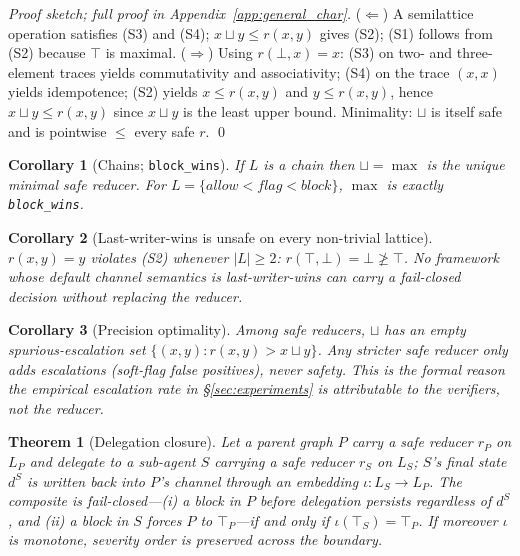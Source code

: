 \documentclass{article}
\newtheorem{theorem}{Theorem}
\newtheorem{corollary}{Corollary}
\begin{document}
\begin{proof}[Proof sketch; full proof in Appendix~\ref{app:general_char}]
($\Leftarrow$) A semilattice operation satisfies (S3) and (S4); $x\sqcup y\le r(x,y)$
gives (S2); (S1) follows from (S2) because $\top$ is maximal.
($\Rightarrow$) Using $r(\bot,x)=x$: (S3) on two- and three-element traces yields
commutativity and associativity; (S4) on the trace $(x,x)$ yields idempotence;
(S2) yields $x\le r(x,y)$ and $y\le r(x,y)$, hence $x\sqcup y\le r(x,y)$ since
$x\sqcup y$ is the least upper bound. Minimality: $\sqcup$ is itself safe and is
pointwise $\le$ every safe $r$. \qed
\end{proof}

\begin{corollary}[Chains; \texttt{block\_wins}]
\label{cor:chain}
If $L$ is a chain then $\sqcup=\max$ is the unique minimal safe reducer. For
$L=\{\textit{allow}<\textit{flag}<\textit{block}\}$, $\max$ is exactly \texttt{block\_wins}.
\end{corollary}

\begin{corollary}[Last-writer-wins is unsafe on every non-trivial lattice]
\label{cor:lww}
$r(x,y)=y$ violates (S2) whenever $|L|\ge2$: $r(\top,\bot)=\bot\not\ge\top$.
No framework whose default channel semantics is last-writer-wins can carry a
fail-closed decision without replacing the reducer.
\end{corollary}

\begin{corollary}[Precision optimality]
\label{cor:precision}
Among safe reducers, $\sqcup$ has an empty spurious-escalation set
$\{(x,y): r(x,y)>x\sqcup y\}$. Any stricter safe reducer only adds escalations
(soft-flag false positives), never safety. This is the formal reason the empirical
escalation rate in \S\ref{sec:experiments} is attributable to the verifiers, not the reducer.
\end{corollary}

\begin{theorem}[Delegation closure]
\label{thm:delegation}
Let a parent graph $P$ carry a safe reducer $r_P$ on $L_P$ and delegate to a
sub-agent $S$ carrying a safe reducer $r_S$ on $L_S$; $S$'s final state $d^S$ is
written back into $P$'s channel through an embedding $\iota:L_S\to L_P$.
The composite is fail-closed---(i) a block in $P$ before delegation persists
regardless of $d^S$, and (ii) a block in $S$ forces $P$ to $\top_P$---if and only
if $\iota(\top_S)=\top_P$. If moreover $\iota$ is monotone, severity order is
preserved across the boundary.
\end{theorem}
\end{document}

